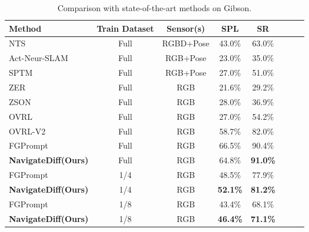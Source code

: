 \begin{table}[t]
\centering
\footnotesize
\caption{Comparison with state-of-the-art methods on Gibson.}
\vspace{-3mm}
\begin{tabular}{@{}lccccccc@{}}
\toprule
Method                  & Train Dataset        & Sensor(s)  & SPL           & SR                        \\ 
\midrule
NTS~\cite{chaplot2020neural}          & Full         & RGBD+Pose  & 43.0\%        & 63.0\%                    \\
Act-Neur-SLAM~\cite{chaplot2020neural}   & Full    & RGB+Pose      & 23.0\%        & 35.0\%    \\
SPTM~\cite{savinov2018semi}        & Full         & RGB+Pose   & 27.0\%        & 51.0\%                    \\
\midrule
ZER~\cite{al2022zero}          & Full         & RGB        & 21.6\%        & 29.2\%                    \\
ZSON~\cite{majumdar2022zson}        & Full        & RGB        & 28.0\%        & 36.9\%                    \\
OVRL~\cite{yadav2023offline}        & Full        & RGB        & 27.0\%        & 54.2\%                    \\
OVRL-V2~\cite{yadav2023ovrl}  & Full        & RGB        & 58.7\%        & 82.0\%                    \\
FGPrompt                & Full         & RGB        & 66.5\%        & 90.4\%                    \\
\textbf{NavigateDiff(Ours)} & Full     & RGB        & 64.8\%           & \textbf{91.0\%}                       \\
\midrule
FGPrompt~\cite{sun2024fgprompt}                & 1/4          & RGB        & 48.5\%        & 77.9\%                   \\
\textbf{NavigateDiff(Ours)} & 1/4     & RGB        & \textbf{52.1\%}           & \textbf{81.2\%}     \\
\midrule
FGPrompt~\cite{sun2024fgprompt}                & 1/8          & RGB        & 43.4\%        & 68.1\%                   \\
\textbf{NavigateDiff(Ours)} & 1/8     & RGB        & \textbf{46.4\%}           & \textbf{71.1\%}     \\

\bottomrule
\end{tabular}
\vspace{-5mm}
\label{tab:sota-gibson}
\end{table}



